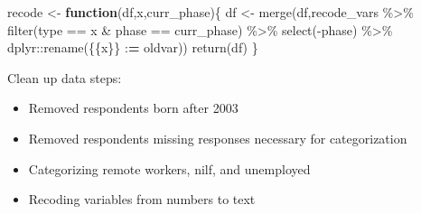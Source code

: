 \documentclass[
]{article}
\newenvironment{Shaded}{\begin{snugshade}}{\end{snugshade}}
\newcommand{\AttributeTok}[1]{\textcolor[rgb]{0.77,0.63,0.00}{#1}}
\newcommand{\ControlFlowTok}[1]{\textcolor[rgb]{0.13,0.29,0.53}{\textbf{#1}}}
\newcommand{\ErrorTok}[1]{\textcolor[rgb]{0.64,0.00,0.00}{\textbf{#1}}}
\newcommand{\FunctionTok}[1]{\textcolor[rgb]{0.00,0.00,0.00}{#1}}
\newcommand{\NormalTok}[1]{#1}
\newcommand{\OtherTok}[1]{\textcolor[rgb]{0.56,0.35,0.01}{#1}}
\newcommand{\SpecialCharTok}[1]{\textcolor[rgb]{0.00,0.00,0.00}{#1}}
\newcommand{\StringTok}[1]{\textcolor[rgb]{0.31,0.60,0.02}{#1}}
\providecommand{\tightlist}{%
  \setlength{\itemsep}{0pt}\setlength{\parskip}{0pt}}
\begin{document}
\begin{Shaded}
\end{Shaded}

\begin{Shaded}
\begin{Highlighting}[]
\NormalTok{recode }\OtherTok{\textless{}{-}} \ControlFlowTok{function}\NormalTok{(df,x,curr\_phase)\{}
\NormalTok{  df }\OtherTok{\textless{}{-}} \FunctionTok{merge}\NormalTok{(df,recode\_vars }\SpecialCharTok{\%\textgreater{}\%}
          \FunctionTok{filter}\NormalTok{(type }\SpecialCharTok{==}\NormalTok{ x }\SpecialCharTok{\&}\NormalTok{ phase }\SpecialCharTok{==}\NormalTok{ curr\_phase) }\SpecialCharTok{\%\textgreater{}\%}
          \FunctionTok{select}\NormalTok{(}\SpecialCharTok{{-}}\NormalTok{phase) }\SpecialCharTok{\%\textgreater{}\%}
\NormalTok{          dplyr}\SpecialCharTok{::}\FunctionTok{rename}\NormalTok{(\{\{x\}\} }\SpecialCharTok{:}\ErrorTok{=}\NormalTok{ oldvar))}
  \FunctionTok{return}\NormalTok{(df)}
\NormalTok{\}}
\end{Highlighting}
\end{Shaded}

Clean up data steps:

\begin{itemize}
\tightlist
\item
  Removed respondents born after 2003
\item
  Removed respondents missing responses necessary for categorization
\item
  Categorizing remote workers, nilf, and unemployed
\item
  Recoding variables from numbers to text
\end{itemize}
\end{document}
